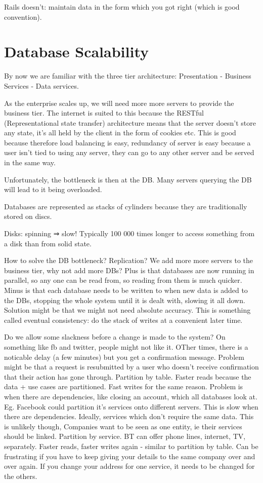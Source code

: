 \documentclass[11pt]{article}
\begin{document}
Rails doesn’t: maintain data in the form  which you got right (which is good convention).

\section{Database Scalability}

By now we are familiar with the three tier architecture: Presentation - Business Services - Data services.

As the enterprise scales up, we will need more more servers to provide the business tier. The internet is suited to this because the RESTful (Representational state transfer) architecture means that the server doesn’t store any state, it’s all held by the client in the form of cookies etc. This is good because therefore load balancing is easy, redundancy of server is easy because a user isn’t tied to using any server, they can go to any other server and be served in the same way.

Unfortunately, the bottleneck is then at the DB. Many servers querying the DB will lead to it being overloaded.

Databases are represented as stacks of cylinders because they are traditionally stored on discs.

Disks: spinning ⇒ slow! Typically 100 000 times longer to access something from a disk than from solid state.

How to solve the DB bottleneck?
Replication? We add more more servers to the business tier, why not add more DBs? Plus is that databases are now running in parallel, so any one can be read from, so reading from them is much quicker. Minus is that each database needs to be written to when new data is added to the DBs, stopping the whole system until it is dealt with, slowing it all down. Solution might be that we might not need absolute accuracy. This is something called eventual consistency: do the stack of writes at a convenient later time.

Do we allow some slackness before a change is made to the system? On something like fb and twitter, people might not like it. OTher times, there is a noticable delay (a few minutes) but you get a confirmation message. Problem might be that a request is resubmitted by a user who doesn’t receive confirmation that their action has gone through.
Partition by table. Faster reads because the data + use cases are partitioned. Fast writes for the same reason. Problem is when there are dependencies, like closing an account, which all databases look at. Eg. Facebook could partition it’s services onto different servers. This is slow when there are dependencies. Ideally, services which don’t require the same data. This is unlikely though, Companies want to be seen as one entity, ie their services should be linked.
Partition by service. BT can offer phone lines, internet, TV, separately. Faster reads, faster writes again - similar to partition by table. Can be frustrating if you have to keep giving your details to the same company over and over again. If you change your address for one service, it needs to be changed for the others. 
\end{document}
